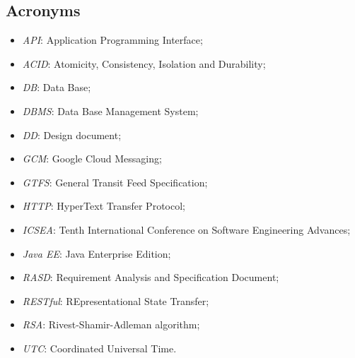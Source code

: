 \subsection{Acronyms}
	\begin{itemize}
	\item \textit{API}: Application Programming Interface;
	\item \textit{ACID}: Atomicity, Consistency, Isolation and Durability;
	\item \textit{DB}: Data Base;
	\item \textit{DBMS}: Data Base Management System;
	\item \textit{DD}: Design document;
	\item \textit{GCM}: Google Cloud Messaging;
	\item \textit{GTFS}: General Transit Feed Specification;
	\item \textit{HTTP}: HyperText Transfer Protocol;
	\item \textit{ICSEA}: Tenth International Conference on Software Engineering Advances;
	\item \textit{Java EE}: Java Enterprise Edition;
	\item \textit{RASD}: Requirement Analysis and Specification Document;
	\item \textit{RESTful}: REpresentational State Transfer;
	\item \textit{RSA}: Rivest-Shamir-Adleman algorithm;
	\item \textit{UTC}: Coordinated Universal Time.
	\end{itemize}
	
